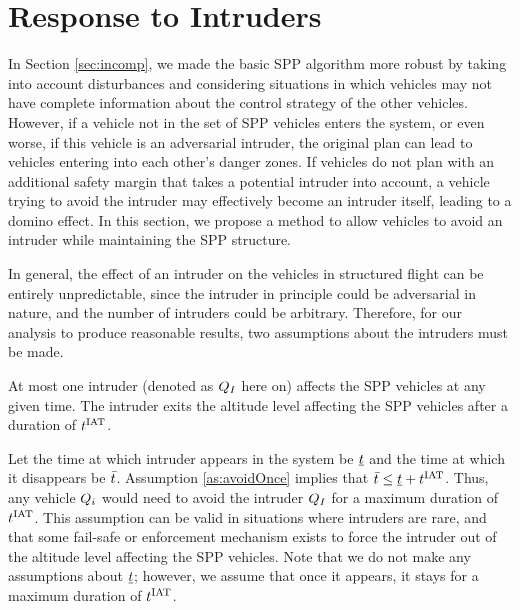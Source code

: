 \section{Response to Intruders \label{sec:intruder}}


In Section \ref{sec:incomp}, we made the basic SPP algorithm more robust by taking into account disturbances and considering situations in which vehicles may not have complete information about the control strategy of the other vehicles. However, if a vehicle not in the set of SPP vehicles enters the system, or even worse, if this vehicle is an adversarial intruder, the original plan can lead to vehicles entering into each other's danger zones. If vehicles do not plan with an additional safety margin that takes a potential intruder into account, a vehicle trying to avoid the intruder may effectively become an intruder itself, leading to a domino effect. In this section, we propose a method to allow vehicles to avoid an intruder while maintaining the SPP structure.

In general, the effect of an intruder on the vehicles in structured flight can be entirely unpredictable, since the intruder in principle could be adversarial in nature, and the number of intruders could be arbitrary. Therefore, for our analysis to produce reasonable results, two assumptions about the intruders must be made.

\begin{assumption}
\label{as:avoidOnce}
At most one intruder (denoted as $Q_I$ here on) affects the SPP vehicles at any given time. The intruder exits the altitude level affecting the SPP vehicles after a duration of $t^\text{IAT}$. 
\end{assumption}

Let the time at which intruder appears in the system be $\underline{t}$ and the time at which it disappears be $\bar{t}$. Assumption \ref{as:avoidOnce} implies that $\bar{t} \leq \underline{t} + t^\text{IAT}$. Thus, any vehicle $Q_i$ would need to avoid the intruder $Q_{I}$ for a maximum duration of $t^\text{IAT}$. This assumption can be valid in situations where intruders are rare, and that some fail-safe or enforcement mechanism exists to force the intruder out of the altitude level affecting the SPP vehicles. Note that we do not make any assumptions about $\underline{t}$; however, we assume that once it appears, it stays for a maximum duration of $t^\text{IAT}$.


